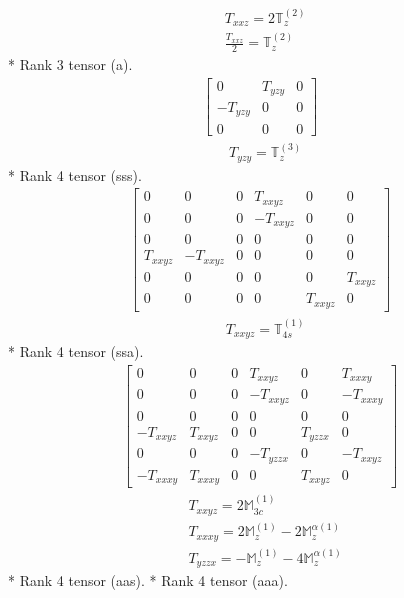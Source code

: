 \documentclass[fleqn,8pt,landscape]{jsarticle}
\begin{document}
\begin{align*}
& T_{xxz} = 2 \mathbb{T}_{z}^{(2)} \\
& \frac{T_{xxz}}{2} = \mathbb{T}_{z}^{(2)}
\end{align*}
* Rank 3 tensor (a).
\begin{align*}
\begin{bmatrix} 0 & T_{yzy} & 0 \\ - T_{yzy} & 0 & 0 \\ 0 & 0 & 0 \end{bmatrix}
\end{align*}
\begin{align*}
& T_{yzy} = \mathbb{T}_{z}^{(3)}
\end{align*}
* Rank 4 tensor (sss).
\begin{align*}
\begin{bmatrix} 0 & 0 & 0 & T_{xxyz} & 0 & 0 \\ 0 & 0 & 0 & - T_{xxyz} & 0 & 0 \\ 0 & 0 & 0 & 0 & 0 & 0 \\ T_{xxyz} & - T_{xxyz} & 0 & 0 & 0 & 0 \\ 0 & 0 & 0 & 0 & 0 & T_{xxyz} \\ 0 & 0 & 0 & 0 & T_{xxyz} & 0 \end{bmatrix}
\end{align*}
\begin{align*}
& T_{xxyz} = \mathbb{T}_{4s}^{(1)}
\end{align*}
* Rank 4 tensor (ssa).
\begin{align*}
\begin{bmatrix} 0 & 0 & 0 & T_{xxyz} & 0 & T_{xxxy} \\ 0 & 0 & 0 & - T_{xxyz} & 0 & - T_{xxxy} \\ 0 & 0 & 0 & 0 & 0 & 0 \\ - T_{xxyz} & T_{xxyz} & 0 & 0 & T_{yzzx} & 0 \\ 0 & 0 & 0 & - T_{yzzx} & 0 & - T_{xxyz} \\ - T_{xxxy} & T_{xxxy} & 0 & 0 & T_{xxyz} & 0 \end{bmatrix}
\end{align*}
\begin{align*}
& T_{xxyz} = 2 \mathbb{M}_{3c}^{(1)} \\
& T_{xxxy} = 2 \mathbb{M}_{z}^{(1)} - 2 \mathbb{M}_{z}^{\alpha(1)} \\
& T_{yzzx} = - \mathbb{M}_{z}^{(1)} - 4 \mathbb{M}_{z}^{\alpha(1)}
\end{align*}
* Rank 4 tensor (aas).
* Rank 4 tensor (aaa).
\end{document}
